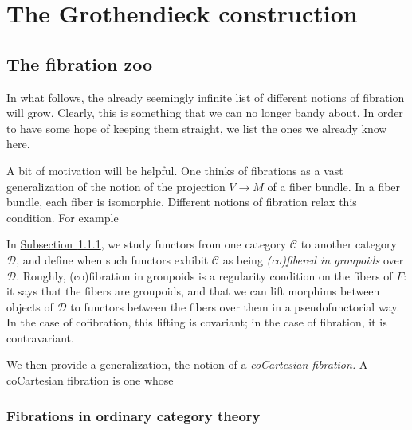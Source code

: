 \documentclass[main.tex]{subfiles}
\begin{document}
\newcommand{\ssmash}{\overset{\star}{\wedge}}

\chapter{The Grothendieck construction}
\label{ch:the_grothendieck_construction}

\section{The fibration zoo}
\label{sec:the_fibration_zoo}

In what follows, the already seemingly infinite list of different notions of fibration will grow. Clearly, this is something that we can no longer bandy about. In order to have some hope of keeping them straight, we list the ones we already know here.

A bit of motivation will be helpful. One thinks of fibrations as a vast generalization of the notion of the projection $V \to M$ of a fiber bundle. In a fiber bundle, each fiber is isomorphic. Different notions of fibration relax this condition. For example

In \hyperref[ssc:fibrations_in_ordinary_category_theory]{Subsection~\ref*{ssc:fibrations_in_ordinary_category_theory}}, we study functors from one category $\mathcal{C}$ to another category $\mathcal{D}$, and define when such functors exhibit $\mathcal{C}$ as being \emph{(co)fibered in groupoids} over $\mathcal{D}$. Roughly, (co)fibration in groupoids is a regularity condition on the fibers of $F$: it says that the fibers are groupoids, and that we can lift morphims between objects of $\mathcal{D}$ to functors between the fibers over them in a pseudofunctorial way. In the case of cofibration, this lifting is covariant; in the case of fibration, it is contravariant.

We then provide a generalization, the notion of a \emph{coCartesian fibration.} A coCartesian fibration is one whose

\subsection{Fibrations in ordinary category theory}
\label{ssc:fibrations_in_ordinary_category_theory}
\end{document}
